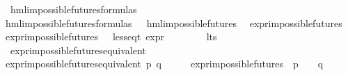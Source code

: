 \begin{isabellebody}
\isanewline
{}\isamarkupfalse%
\ hml{\isacharunderscore}{\kern0pt}impossible{\isacharunderscore}{\kern0pt}futures{\isacharunderscore}{\kern0pt}formulas\isanewline
\ \ \isanewline
{\isachardoublequoteopen}hml{\isacharunderscore}{\kern0pt}impossible{\isacharunderscore}{\kern0pt}futures{\isacharunderscore}{\kern0pt}formulas\ {\isasymequiv}\ {\isacharbraceleft}{\kern0pt}{\isasymphi}{\isachardot}{\kern0pt}\ hml{\isacharunderscore}{\kern0pt}impossible{\isacharunderscore}{\kern0pt}futures\ {\isasymphi}{\isacharbraceright}{\kern0pt}{\isachardoublequoteclose}\isanewline
\isanewline
{}\isamarkupfalse%
\ expr{\isacharunderscore}{\kern0pt}impossible{\isacharunderscore}{\kern0pt}futures\isanewline
\ \ \isanewline
{\isachardoublequoteopen}expr{\isacharunderscore}{\kern0pt}impossible{\isacharunderscore}{\kern0pt}futures\ {\isacharequal}{\kern0pt}\ {\isacharbraceleft}{\kern0pt}{\isasymphi}{\isachardot}{\kern0pt}\ {\isacharparenleft}{\kern0pt}less{\isacharunderscore}{\kern0pt}eq{\isacharunderscore}{\kern0pt}t\ {\isacharparenleft}{\kern0pt}expr\ {\isasymphi}{\isacharparenright}{\kern0pt}\ {\isacharparenleft}{\kern0pt}{\isasyminfinity}{\isacharcomma}{\kern0pt}\ {}{\isacharcomma}{\kern0pt}\ {}{\isacharcomma}{\kern0pt}\ {}{\isacharcomma}{\kern0pt}\ {\isasyminfinity}{\isacharcomma}{\kern0pt}\ {}{\isacharparenright}{\kern0pt}{\isacharparenright}{\kern0pt}{\isacharbraceright}{\kern0pt}{\isachardoublequoteclose}\isanewline
\isanewline
{}\isamarkupfalse%
\ lts\isanewline
{}\isanewline
\isanewline
{}\isamarkupfalse%
\ expr{\isacharunderscore}{\kern0pt}impossible{\isacharunderscore}{\kern0pt}futures{\isacharunderscore}{\kern0pt}equivalent\ \isanewline
\ \ \isanewline
{\isachardoublequoteopen}expr{\isacharunderscore}{\kern0pt}impossible{\isacharunderscore}{\kern0pt}futures{\isacharunderscore}{\kern0pt}equivalent\ p\ q\ {\isasymequiv}\ {\isacharparenleft}{\kern0pt}{\isasymforall}\ {\isasymphi}{\isachardot}{\kern0pt}\ {\isasymphi}\ {\isasymin}\ expr{\isacharunderscore}{\kern0pt}impossible{\isacharunderscore}{\kern0pt}futures\ {\isasymlongrightarrow}\ {\isacharparenleft}{\kern0pt}p\ {\isasymTurnstile}\ {\isasymphi}{\isacharparenright}{\kern0pt}\ {\isasymlongleftrightarrow}\ {\isacharparenleft}{\kern0pt}q\ {\isasymTurnstile}\ {\isasymphi}{\isacharparenright}{\kern0pt}{\isacharparenright}{\kern0pt}{\isachardoublequoteclose}\isanewline
{}\isamarkupfalse%
%
\begin{isamarkuptext}%

\end{isamarkuptext}
\end{isabellebody}
